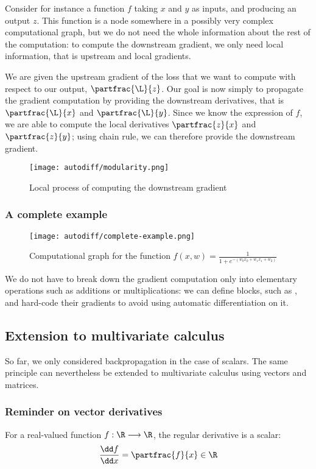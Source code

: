 Consider for instance a function $f$ taking $x$ and $y$ as inputs, and producing an output $z$. This function is a node somewhere in a possibly very complex computational graph, but we do not need the whole information about the rest of the computation: to compute the downstream gradient, we only need local information, that is upstream and local gradients. 

We are given the upstream gradient of the loss that we want to compute with respect to our output, $\partfrac{\L}{z}$. Our goal is now simply to propagate the gradient computation by providing the downstream derivatives, that is $\partfrac{\L}{x}$ and $\partfrac{\L}{y}$. Since we know the expression of $f$, we are able to compute the local derivatives $\partfrac{z}{x}$ and $\partfrac{z}{y}$; using chain rule, we can therefore provide the downstream gradient.
\begin{figure}[H]
    \centering
    \texttt{[image: autodiff/modularity.png]}
    \caption{Local process of computing the downstream gradient}
\end{figure}

\subsubsection{A complete example}
\begin{figure}[H]
    \centering
    \texttt{[image: autodiff/complete-example.png]}
    \caption{Computational graph for the function $f(x, w) = \frac{1}{1+e^{-(w_0x_0+w_1x_1+w_2)}}$}
\end{figure}
We do not have to break down the gradient computation only into elementary operations such as additions or multiplications: we can define blocks, such as , and hard-code their gradients to avoid using automatic differentiation on it.

\subsection{Extension to multivariate calculus}
So far, we only considered backpropagation in the case of scalars. The same principle can nevertheless be extended to multivariate calculus using vectors and matrices.

\subsubsection{Reminder on vector derivatives}
For a real-valued function $f:\R\longrightarrow\R$, the regular derivative is a scalar:
\begin{equation*}
    \frac{\dd f}{\dd x} = \partfrac{f}{x} \in \R
\end{equation*}

